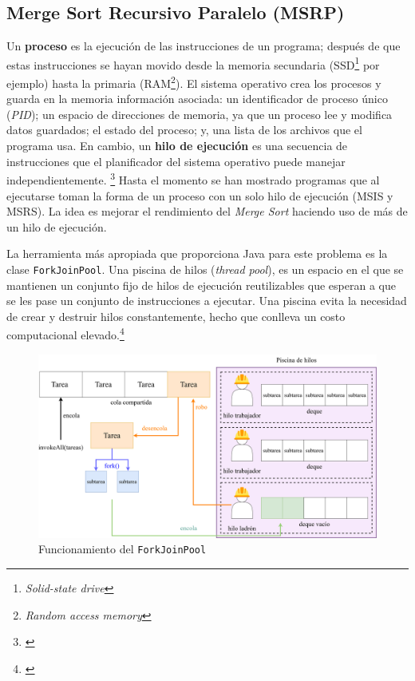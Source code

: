 \documentclass[titlepage]{article}
\begin{document}
\newpage
\subsection{Merge Sort Recursivo Paralelo (MSRP)}%
Un \textbf{proceso} es la ejecución de las instrucciones de un programa; después de que estas instrucciones se hayan movido desde la memoria secundaria (SSD\footnote{\textit{Solid-state drive}} por ejemplo) hasta la primaria (RAM\footnote{\textit{Random access memory}}). El sistema operativo crea los procesos y guarda en la memoria información asociada: un identificador de proceso único (\textit{PID}); un espacio de direcciones de memoria, ya que un proceso lee y modifica datos guardados; el estado del proceso; y, una lista de los archivos que el programa usa. En cambio, un \textbf{hilo de ejecución} es una secuencia de instrucciones que el planificador del sistema operativo puede manejar independientemente. \footnote{\cite{bobrov-2023}} Hasta el momento se han mostrado programas que al ejecutarse toman la forma de un proceso con un solo hilo de ejecución (MSIS y MSRS). La idea es mejorar el rendimiento del \textit{Merge Sort} haciendo uso de más de un hilo de ejecución. 

La herramienta más apropiada que proporciona Java para este problema es la clase \lstinline|ForkJoinPool|.\footnotemark {} Una piscina de hilos (\textit{thread pool}), es un espacio en el que se mantienen un conjunto fijo de hilos de ejecución reutilizables que esperan a que se les pase un conjunto de instrucciones a ejecutar. Una piscina evita la necesidad de crear y destruir hilos constantemente, hecho que conlleva un costo computacional elevado.\footnote{\cite{engle_2022}}

\begin{figure}[h]
	\centering
	\includegraphics[width=0.75\linewidth]{Diagrames/forkJoinPool.png}
	\caption{Funcionamiento del \lstinline{ForkJoinPool}}
	\label{fig:forkJoinPool}
\end{figure}
\end{document}
